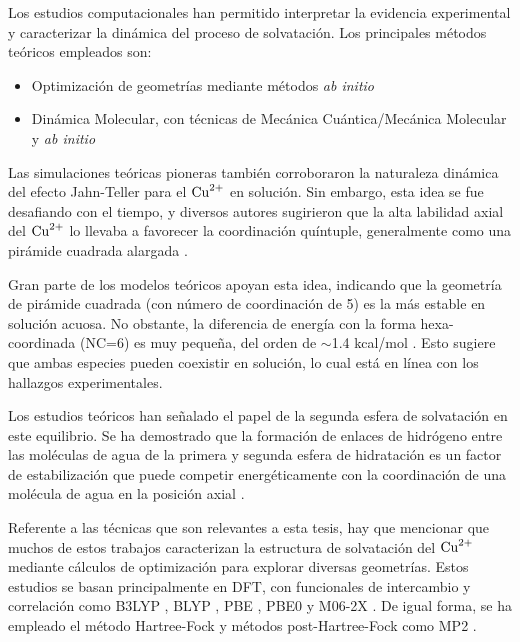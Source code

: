    Los estudios computacionales han permitido interpretar la evidencia experimental y caracterizar la dinámica del proceso de solvatación. Los principales métodos teóricos empleados son:

    \begin{itemize}
        \item Optimización de geometrías mediante métodos \textit{ab initio}
        \item Dinámica Molecular, con técnicas de Mecánica Cuántica/Mecánica Molecular y \textit{ab initio}
    \end{itemize}


    Las simulaciones teóricas pioneras también corroboraron la naturaleza dinámica del efecto Jahn-Teller para el $\ce{Cu^{2+}}$ en solución. Sin embargo, esta idea se fue desafiando con el tiempo, y diversos autores sugirieron que la alta labilidad axial del $\ce{Cu^{2+}}$ lo llevaba a favorecer la coordinación quíntuple, generalmente como una pirámide cuadrada alargada \cite{Wa-2001-01, Wa-2005-02, Wa-2008-04, Wa-2008-01}.
    
    Gran parte de los modelos teóricos apoyan esta idea, indicando que la geometría de pirámide cuadrada (con número de coordinación de 5) es la más estable en solución acuosa. No obstante, la diferencia de energía con la forma hexa-coordinada (NC=6) es muy pequeña, del orden de $\sim$1.4 kcal/mol \cite{Wa-2008-01, Wa-2009-02}. Esto sugiere que ambas especies pueden coexistir en solución, lo cual está en línea con los hallazgos experimentales.
    
    Los estudios teóricos han señalado el papel de la segunda esfera de solvatación en este equilibrio. Se ha demostrado que la formación de enlaces de hidrógeno entre las moléculas de agua de la primera y segunda esfera de hidratación es un factor de estabilización que puede competir energéticamente con la coordinación de una molécula de agua en la posición axial \cite{Wa-2007-03, Wa-2008-01, Wa-2024-01}.
    
    Referente a las técnicas que son relevantes a esta tesis, hay que mencionar que muchos de estos trabajos caracterizan la estructura de solvatación del $\ce{Cu^{2+}}$ mediante cálculos de optimización para explorar diversas geometrías. Estos estudios se basan principalmente en DFT, con funcionales de intercambio y correlación como B3LYP \cite{Wa-2004-01, Wa-2005-03, Wa-2007-02, Wa-2007-03, Wa-2008-01, Wa-2009-01}, BLYP \cite{Wa-2010-02}, PBE \cite{Wa-2017-01}, PBE0 \cite{Wa-2018-01, Wa-2019-01} y M06-2X \cite{Wa-2018-01}. De igual forma, se ha empleado el método Hartree-Fock \cite{Wa-2007-03} y métodos post-Hartree-Fock como MP2 \cite{Wa-2007-03, Wa-2017-01, Wa-2024-03, Wa-2024-01}.
    
